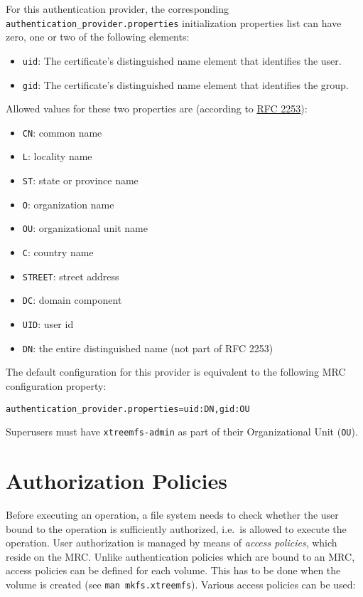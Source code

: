 \documentclass[a4paper,10pt]{book}
\begin{document}
For this authentication provider, the corresponding \texttt{authentication\_provider.properties} initialization properties list can have zero, one or two of the following elements:
\begin{itemize}
  \item \texttt{uid}: The certificate's distinguished name element that identifies the user.
  \item \texttt{gid}: The certificate's distinguished name element that identifies the group.
\end{itemize}

Allowed values for these two properties are (according to \href{http://www.ietf.org/rfc/rfc2253.txt}{RFC 2253}):
\begin{itemize}
  \item \texttt{CN}: common name
  \item \texttt{L}: locality name
  \item \texttt{ST}: state or province name
  \item \texttt{O}: organization name
  \item \texttt{OU}: organizational unit name
  \item \texttt{C}: country name
  \item \texttt{STREET}: street address
  \item \texttt{DC}: domain component
  \item \texttt{UID}: user id
  \item \texttt{DN}: the entire distinguished name (not part of RFC 2253)
\end{itemize}

The default configuration for this provider is equivalent to the following MRC configuration property:

\begin{verbatim}
authentication_provider.properties=uid:DN,gid:OU
\end{verbatim}

Superusers must have \texttt{xtreemfs-admin} as part of their Organizational Unit (\texttt{OU}).


\section{Authorization Policies} \label{sec:access_policies}
Before executing an operation, a file system needs to check whether the user bound to the operation is sufficiently authorized, i.e.\ is allowed to execute the operation. User authorization is managed by means of \emph{access policies}, which reside on the MRC. Unlike authentication policies which are bound to an MRC, access policies can be defined for each volume. This has to be done when the volume is created (see \texttt{man mkfs.xtreemfs}). Various access policies can be used: 
\end{document}
